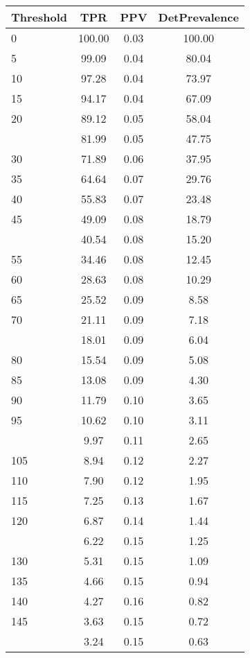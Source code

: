 \begin{table}[ht]
\centering
\begin{tabular}{lccc}
  \toprule
Threshold & TPR & PPV & DetPrevalence \\ 
  \midrule
0 & 100.00 & 0.03 & 100.00 \\ 
  5 & 99.09 & 0.04 & 80.04 \\ 
  10 & 97.28 & 0.04 & 73.97 \\ 
  15 & 94.17 & 0.04 & 67.09 \\ 
  20 & 89.12 & 0.05 & 58.04 \\ 
   \addlinespace
25 & 81.99 & 0.05 & 47.75 \\ 
  30 & 71.89 & 0.06 & 37.95 \\ 
  35 & 64.64 & 0.07 & 29.76 \\ 
  40 & 55.83 & 0.07 & 23.48 \\ 
  45 & 49.09 & 0.08 & 18.79 \\ 
   \addlinespace
50 & 40.54 & 0.08 & 15.20 \\ 
  55 & 34.46 & 0.08 & 12.45 \\ 
  60 & 28.63 & 0.08 & 10.29 \\ 
  65 & 25.52 & 0.09 & 8.58 \\ 
  70 & 21.11 & 0.09 & 7.18 \\ 
   \addlinespace
75 & 18.01 & 0.09 & 6.04 \\ 
  80 & 15.54 & 0.09 & 5.08 \\ 
  85 & 13.08 & 0.09 & 4.30 \\ 
  90 & 11.79 & 0.10 & 3.65 \\ 
  95 & 10.62 & 0.10 & 3.11 \\ 
   \addlinespace
100 & 9.97 & 0.11 & 2.65 \\ 
  105 & 8.94 & 0.12 & 2.27 \\ 
  110 & 7.90 & 0.12 & 1.95 \\ 
  115 & 7.25 & 0.13 & 1.67 \\ 
  120 & 6.87 & 0.14 & 1.44 \\ 
   \addlinespace
125 & 6.22 & 0.15 & 1.25 \\ 
  130 & 5.31 & 0.15 & 1.09 \\ 
  135 & 4.66 & 0.15 & 0.94 \\ 
  140 & 4.27 & 0.16 & 0.82 \\ 
  145 & 3.63 & 0.15 & 0.72 \\ 
   \addlinespace
150 & 3.24 & 0.15 & 0.63 \\ 

\end{tabular}
\end{table}
